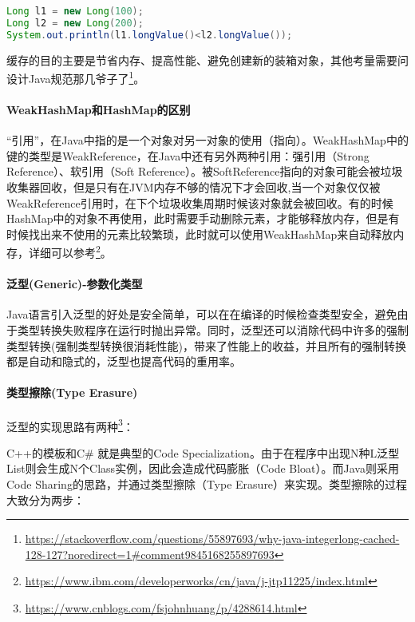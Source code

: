 \documentclass[../../../interview-questions.tex]{subfiles}
\begin{document}
\begin{lstlisting}[language=Java]
Long l1 = new Long(100);
Long l2 = new Long(200);
System.out.println(l1.longValue()<l2.longValue());
\end{lstlisting}

缓存的目的主要是节省内存、提高性能、避免创建新的装箱对象，其他考量需要问设计Java规范那几爷子了\footnote{\url{https://stackoverflow.com/questions/55897693/why-java-integerlong-cached-128-127?noredirect=1\#comment9845168255897693}}。

\paragraph{WeakHashMap和HashMap的区别}

“引用”，在Java中指的是一个对象对另一对象的使用（指向）。WeakHashMap中的键的类型是WeakReference，在Java中还有另外两种引用：强引用（Strong Reference）、软引用（Soft Reference）。被SoftReference指向的对象可能会被垃圾收集器回收，但是只有在JVM内存不够的情况下才会回收,当一个对象仅仅被WeakReference引用时，在下个垃圾收集周期时候该对象就会被回收。有的时候HashMap中的对象不再使用，此时需要手动删除元素，才能够释放内存，但是有时候找出来不使用的元素比较繁琐，此时就可以使用WeakHashMap来自动释放内存，详细可以参考\footnote{\url{https://www.ibm.com/developerworks/cn/java/j-jtp11225/index.html}}。




\paragraph{泛型(Generic)-参数化类型}

Java语言引入泛型的好处是安全简单，可以在在编译的时候检查类型安全，避免由于类型转换失败程序在运行时抛出异常。同时，泛型还可以消除代码中许多的强制类型转换(强制类型转换很消耗性能)，带来了性能上的收益，并且所有的强制转换都是自动和隐式的，泛型也提高代码的重用率。

\paragraph{类型擦除(Type Erasure)}

泛型的实现思路有两种\footnote{\url{https://www.cnblogs.com/fsjohnhuang/p/4288614.html}}：



C++的模板和C\# 就是典型的Code Specialization。由于在程序中出现N种L泛型List则会生成N个Class实例，因此会造成代码膨胀（Code Bloat）。而Java则采用Code Sharing的思路，并通过类型擦除（Type Erasure）来实现。类型擦除的过程大致分为两步：
\end{document}

